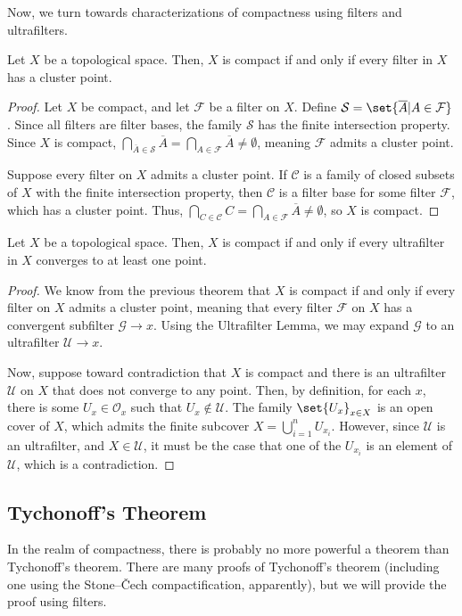 \documentclass[11pt]{mypackage}
\begin{document}
  Now, we turn towards characterizations of compactness using filters and ultrafilters.
  \begin{theorem}
    Let $X$ be a topological space. Then, $X$ is compact if and only if every filter in $X$ has a cluster point.
  \end{theorem}
  \begin{proof}
    Let $X$ be compact, and let $\mathcal{F}$ be a filter on $X$. Define $\mathcal{S} = \set{ \overline{A} | A\in \mathcal{F} }$. Since all filters are filter bases, the family $ \mathcal{S} $ has the finite intersection property. Since $X$ is compact, $\bigcap_{ \overline{A}\in \mathcal{S} } \overline{A} = \bigcap_{A\in \mathcal{F}} \overline{A} \neq \emptyset$, meaning $\mathcal{F}$ admits a cluster point.\newline

    Suppose every filter on $X$ admits a cluster point. If $\mathcal{C}$ is a family of closed subsets of $X$ with the finite intersection property, then $\mathcal{C}$ is a filter base for some filter $\mathcal{F}$, which has a cluster point. Thus, $\bigcap_{C\in \mathcal{C}} C = \bigcap_{A\in \mathcal{F}} \overline{A} \neq \emptyset$, so $X$ is compact.
  \end{proof}
  \begin{theorem}
    Let $X$ be a topological space. Then, $X$ is compact if and only if every ultrafilter in $X$ converges to at least one point.
  \end{theorem}
  \begin{proof}
    We know from the previous theorem that $X$ is compact if and only if every filter on $X$ admits a cluster point, meaning that every filter $\mathcal{F}$ on $X$ has a convergent subfilter $\mathcal{G}\rightarrow x$. Using the Ultrafilter Lemma, we may expand $\mathcal{G}$ to an ultrafilter $\mathcal{U}\rightarrow x$.\newline

    Now, suppose toward contradiction that $X$ is compact and there is an ultrafilter $\mathcal{U}$ on $X$ that does not converge to any point. Then, by definition, for each $x$, there is some $U_x\in \mathcal{O}_x$ such that $U_x\notin \mathcal{U}$. The family $\set{U_x}_{x\in X}$ is an open cover of $X$, which admits the finite subcover $X = \bigcup_{i=1}^{n}U_{x_i}$. However, since $\mathcal{U}$ is an ultrafilter, and $X\in \mathcal{U}$, it must be the case that one of the $U_{x_i}$ is an element of $\mathcal{U}$, which is a contradiction.
  \end{proof}
\subsection{Tychonoff's Theorem}%
In the realm of compactness, there is probably no more powerful a theorem than Tychonoff's theorem. There are many proofs of Tychonoff's theorem (including one using the Stone--\v{C}ech compactification, apparently), but we will provide the proof using filters.\newline
\end{document}

